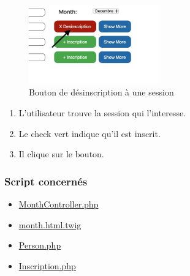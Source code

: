 \begin{figure}[h]
	\includegraphics[width=0.5\textwidth,center]{Figures/us5-1}
	\caption{Bouton de désinscription à une session}
\end{figure}

\begin{enumerate}
	\item L'utilisateur trouve la session qui l'interesse.
	\item Le check vert indique qu'il est inscrit.
	\item Il clique sur le bouton.
\end{enumerate}

\vspace{\baselineskip}
\subsubsection{Script concernés}
	\begin{itemize}
		\item \href{https://github.com/victorsmits/Aquabike/blob/master/backend/src/Controller/MonthController.php}{MonthController.php}
		\item \href{https://github.com/victorsmits/Aquabike/blob/master/backend/templates/registration/month.html.twig}{month.html.twig}
		\item \href{https://github.com/victorsmits/Aquabike/blob/master/backend/src/Entity/Person.php}{Person.php}
		\item \href{https://github.com/victorsmits/Aquabike/blob/master/backend/src/Entity/Inscription.php}{Inscription.php}
	\end{itemize}